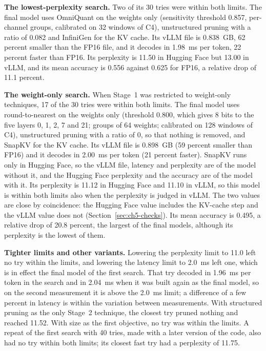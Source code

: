 \documentclass[
11pt, %
english, %
singlespacing, %
headsepline, %
]{MastersDoctoralThesis} %
\begin{document}
\textbf{The lowest-perplexity search.} Two of its 30 tries were within both limits. The final model uses OmniQuant on the weights only (sensitivity threshold 0.857, per-channel groups, calibrated on 32 windows of C4), unstructured pruning with a ratio of 0.082 and InfiniGen for the KV cache. Its vLLM file is 0.838~GB, 62 percent smaller than the FP16 file, and it decodes in 1.98~ms per token, 22 percent faster than FP16. Its perplexity is 11.50 in Hugging Face but 13.00 in vLLM, and its mean accuracy is 0.556 against 0.625 for FP16, a relative drop of 11.1 percent.

\textbf{The weight-only search.} When Stage~1 was restricted to weight-only techniques, 17 of the 30 tries were within both limits. The final model uses round-to-nearest on the weights only (threshold 0.800, which gives 8 bits to the five layers 0, 1, 2, 7 and 21; groups of 64 weights; calibrated on 128 windows of C4), unstructured pruning with a ratio of 0, so that nothing is removed, and SnapKV for the KV cache. Its vLLM file is 0.898~GB (59 percent smaller than FP16) and it decodes in 2.00~ms per token (21 percent faster). SnapKV runs only in Hugging Face, so the vLLM file, latency and perplexity are of the model without it, and the Hugging Face perplexity and the accuracy are of the model with it. Its perplexity is 11.12 in Hugging Face and 11.10 in vLLM, so this model is within both limits also when the perplexity is judged in vLLM. The two values are close by coincidence: the Hugging Face value includes the KV-cache step and the vLLM value does not (Section~\ref{sec:ch5-checks}). Its mean accuracy is 0.495, a relative drop of 20.8 percent, the largest of the final models, although its perplexity is the lowest of them.

\textbf{Tighter limits and other variants.} Lowering the perplexity limit to 11.0 left no try within the limits, and lowering the latency limit to 2.0~ms left one, which is in effect the final model of the first search. That try decoded in 1.96~ms per token in the search and in 2.04~ms when it was built again as the final model, so on the second measurement it is above the 2.0~ms limit; a difference of a few percent in latency is within the variation between measurements. With structured pruning as the only Stage~2 technique, the closest try pruned nothing and reached 11.52. With size as the first objective, no try was within the limits. A repeat of the first search with 40 tries, made with a later version of the code, also had no try within both limits; its closest fast try had a perplexity of 11.75.
\end{document}
